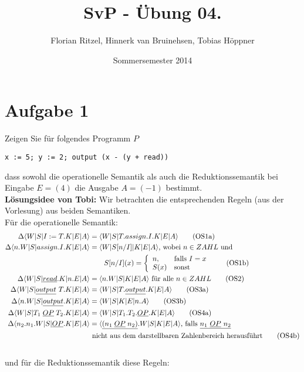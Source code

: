 \documentclass[ngerman,a4paper]{report}
\author{Florian Ritzel, Hinnerk van Bruinehsen, Tobias Höppner}
\title{SvP - Übung 04. }
\date{Sommersemester 2014}
\renewcommand{\maketitle}{}
\begin{document}
\maketitle
\section*{Aufgabe 1}
Zeigen Sie für folgendes Programm $P$
\begin{lstlisting}
x := 5; y := 2; output (x - (y + read))
\end{lstlisting}
dass sowohl die operationelle Semantik als auch die Reduktionssemantik bei Eingabe $E = (4)$ die Ausgabe $A = (-1)$ bestimmt.\\
\textbf{Lösungsidee von Tobi:}
Wir betrachten die entsprechenden Regeln (aus der Vorlesung) aus beiden Semantiken.\\
Für die operationelle Semantik:
\begin{align}
\Delta\langle W|S|I:=T.K|E|A\rangle &= \langle W|S|T.assign.I.K|E|A\rangle \tag{OS1a}\\
\Delta\langle n.W|S|assign.I.K|E|A\rangle &= \langle W|S[n/I]|K|E|A\rangle\text{, wobei }n\in ZAHL\text{ und } \notag\\&\quad\quad S[n/I](x) = \left\lbrace\begin{array}{l l}
n,&\text{falls }I =x\notag\\
	S(x)& \text{sonst}\notag\\
\end{array}\right.\tag{OS1b}\\
\Delta\langle W|S|\underline{read}.K|n.E|A\rangle &= \langle n.W|S|K|E|A\rangle\text{ für alle }n\in ZAHL\tag{OS2}\\
\Delta\langle W|S|\underline{output}\ T.K|E|A\rangle &= \langle W|S|T.\underline{output}.K|E|A\rangle\tag{OS3a}\\
\Delta\langle n.W|S|\underline{output}.K|E|A\rangle &= \langle W|S|K|E|n.A\rangle\tag{OS3b}\\
\Delta\langle W|S|T_1\;\underline{OP}\;T_2.K|E|A\rangle &= \langle W|S|T_1.T_2.\underline{OP}.K|E|A\rangle\tag{OS4a}\\
\Delta\langle n_2.n_1.W|S|\underline{OP}.K|E|A\rangle &= \langle \underline{(n_1\;\underline{OP}\;n_2)}.W|S|K|E|A\rangle\text{, falls }\underline{n_1\ \underline{OP}\ n_2}\notag\\&\text{ nicht aus dem darstellbaren Zahlenbereich herausführt}\tag{OS4b}\\\notag
\end{align}
und für die Reduktionssemantik diese  Regeln:
\end{document}

